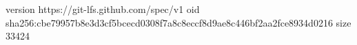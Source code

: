 version https://git-lfs.github.com/spec/v1
oid sha256:cbe79957b8e3d3cf5bcecd0308f7a8c8eccf8d9ae8c446bf2aa2fce8934d0216
size 33424
